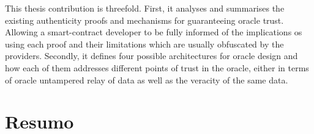 This thesis contribution is threefold. First, it analyses and summarises the existing authenticity proofs and mechanisms for guaranteeing oracle trust. Allowing a smart-contract developer to be fully informed of the implications os using each proof and their limitations which are usually obfuscated by the providers. Secondly, it defines four possible architectures for oracle design and how each of them addresses different points of trust in the oracle, either in terms of oracle untampered relay of data as well as the veracity of the same data.



\chapter*{Resumo}







